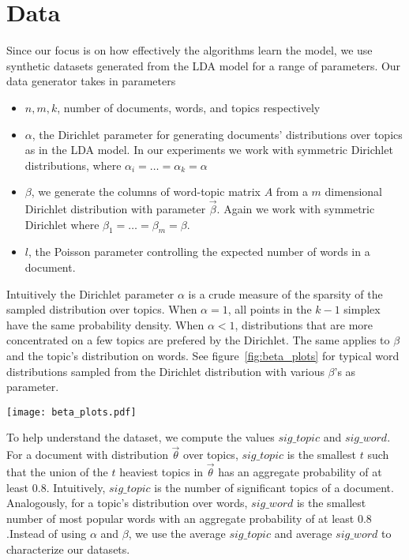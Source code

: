 \documentclass{article}
\begin{document}
\section{Data} \label{sec:data}
Since our focus is on how effectively the algorithms learn the model, we use synthetic datasets generated from the LDA model for a range of parameters. Our data generator takes in parameters
\begin{itemize}
	\item $n,m,k$, number of documents, words, and topics respectively
	\item $\alpha$, the Dirichlet parameter for generating documents' distributions over topics as in the LDA model. In our experiments we work with symmetric Dirichlet distributions, where $\alpha_i=\ldots=\alpha_k=\alpha$
	\item $\beta$, we generate the columns of word-topic matrix $A$ from a $m$ dimensional Dirichlet distribution with parameter $\vec{\beta}$. Again we work with symmetric Dirichlet where $\beta_1=\ldots=\beta_m=\beta$. 
	\item $l$, the Poisson parameter controlling the expected number of words in a document.
\end{itemize}
Intuitively the Dirichlet parameter $\alpha$ is a crude measure of the sparsity of the sampled distribution over topics. When $\alpha=1$, all points in the $k-1$ simplex have the same probability density. When $\alpha<1$, distributions that are more concentrated on a few topics are prefered by the Dirichlet. The same applies to $\beta$ and the topic's distribution on words. See figure~\ref{fig:beta_plots} for typical word distributions sampled from the Dirichlet distribution with various $\beta$'s as parameter. 
\setlength\tabcolsep{0.5pt}
\begin{figure*}
	\centering
	\texttt{[image: beta\_plots.pdf]}
	\caption{Plot of distributions on words for various $\beta$. $m=1000$, each distribution is plotted along with its cdf after sorting the words by popularity. Refer to the y-axis on the right for the scaling of the distributions. In general, larger $\beta$ values yield flatter distributions.}
	\label{fig:beta_plots}
\end{figure*} 
\setlength\tabcolsep{6pt}
To help understand the dataset, we compute the values $sig\_topic$ and $sig\_word$. For a document with distribution $\vec{\theta}$ over topics, $sig\_topic$ is the smallest $t$ such that the union of the $t$ heaviest topics in $\vec{\theta}$ has an aggregate probability of at least $0.8$. Intuitively, $sig\_topic$ is the number of significant topics of a document. Analogously, for a topic's distribution over words, $sig\_word$ is the smallest number of most popular words with an aggregate probability of at least $0.8$.Instead of using $\alpha$ and $\beta$, we use the average $sig\_topic$ and average $sig\_word$ to characterize our datasets. 
\end{document}
